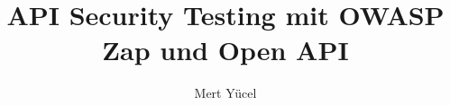 \documentclass[fontsize=12pt,bachelor,german]{hgbthesis}
\title{API Security Testing mit OWASP Zap und Open API}
\author{Mert Yücel}
\begin{document}

\frontmatter                    %

\newpage\null\thispagestyle{empty}\newpage

\setcounter{page}{1}

\setcounter{secnumdepth}{4}
\setcounter{tocdepth}{2}
\tableofcontents
\listoffigures
\listoftables
\renewcommand{\lstlistlistingname}{Verzeichnis der Quellcodes}
\renewcommand{\lstlistingname}{Quellcode}
\lstlistoflistings
		

\mainmatter          %









\appendix                                            %
\MakeBibliography                        %

\end{document}
